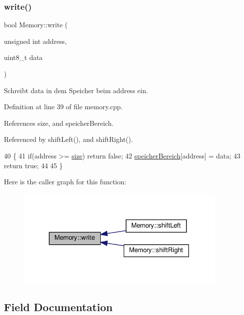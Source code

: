 \subsubsection{\texorpdfstring{write()}{write()}}
{\footnotesize\ttfamily bool Memory\+::write (\begin{DoxyParamCaption}\item[{unsigned int}]{address,  }\item[{uint8\+\_\+t}]{data }\end{DoxyParamCaption})}

Schreibt data in dem Speicher beim {\ttfamily address} ein. 

Definition at line 39 of file memory.\+cpp.



References size, and speicher\+Bereich.



Referenced by shift\+Left(), and shift\+Right().


\begin{DoxyCode}
40 \{
41     \textcolor{keywordflow}{if}(address >= \mbox{\hyperlink{class_memory_a97e5472d284e8daceeb740acb2170ae0}{size}}) \textcolor{keywordflow}{return} \textcolor{keyword}{false};
42     \mbox{\hyperlink{class_memory_a31e171332b705e39bb13e421c7863a5f}{speicherBereich}}[address] = data;
43     \textcolor{keywordflow}{return} \textcolor{keyword}{true};
44 
45 \}
\end{DoxyCode}
Here is the caller graph for this function\+:
\nopagebreak
\begin{figure}[H]
\begin{center}
\leavevmode
\includegraphics[width=295pt]{class_memory_a0e00ea7d13e602be37af361426aa3a50_icgraph}
\end{center}
\end{figure}


\subsection{Field Documentation}
\mbox{\label{class_memory_a97e5472d284e8daceeb740acb2170ae0}} 
